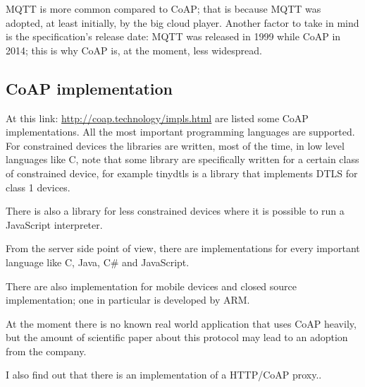 	MQTT is more common compared to CoAP; that is because MQTT was adopted, at least initially, by the big cloud player.\newline
	Another factor to take in mind is the specification's release date: MQTT was released in 1999 while CoAP in 2014; this is why CoAP is, at the moment, less widespread.\newline
	
	\subsection{CoAP implementation}
	At this link: \url{http://coap.technology/impls.html} are listed some CoAP implementations.\newline
	All the most important programming languages are supported.\newline
	For constrained devices the libraries are written, most of the time, in low level languages like C, note that some library are specifically written for a certain class of constrained device, for example tinydtls is a library that implements DTLS for class 1 devices.\newline
	
	There is also a library for less constrained devices where it is possible to run a JavaScript interpreter.\newline
	
	From the server side point of view, there are implementations for every important language like C, Java, C\# and JavaScript.\newline
	
	There are also implementation for mobile devices and closed source implementation; one in particular is developed by ARM.\newline
	
	At the moment there is no known real world application that uses CoAP heavily, but the amount of scientific paper about this protocol may lead to an adoption from the company.
	\newline
	
	I also find out that there is an implementation of a HTTP/CoAP proxy.\cite{rossini2012design}.
